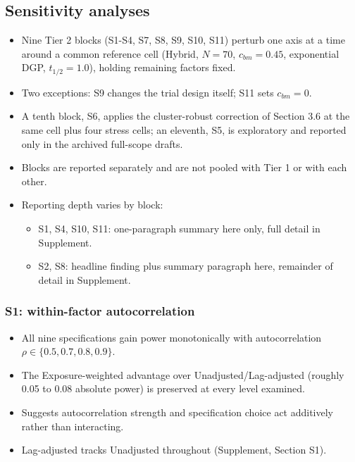 \documentclass[
  11pt,
]{article}
\providecommand{\tightlist}{%
  \setlength{\itemsep}{0pt}\setlength{\parskip}{0pt}}
\begin{document}
\subsection{Sensitivity analyses}\label{sensitivity-analyses}

\begin{itemize}
\tightlist
\item
  Nine Tier 2 blocks (S1-S4, S7, S8, S9, S10, S11) perturb one axis at
  a time around a common reference cell (Hybrid, \(N=70\),
  \(c_{bm}=0.45\), exponential DGP, \(t_{1/2}=1.0\)), holding remaining
  factors fixed.
\item
  Two exceptions: S9 changes the trial design itself; S11 sets
  \(c_{bm}=0\).
\item
  A tenth block, S6, applies the cluster-robust correction of Section
  3.6 at the same cell plus four stress cells; an eleventh, S5, is
  exploratory and reported only in the archived full-scope drafts.
\item
  Blocks are reported separately and are not pooled with Tier 1 or
  with each other.
\item
  Reporting depth varies by block:

  \begin{itemize}
  \tightlist
  \item
    S1, S4, S10, S11: one-paragraph summary here only, full detail in
    Supplement.
  \item
    S2, S8: headline finding plus summary paragraph here, remainder
    of detail in Supplement.
  \end{itemize}
\end{itemize}

\subsubsection{S1: within-factor autocorrelation}\label{s1-within-factor-autocorrelation}

\begin{itemize}
\tightlist
\item
  All nine specifications gain power monotonically with
  autocorrelation \(\rho \in \{0.5, 0.7, 0.8, 0.9\}\).
\item
  The Exposure-weighted advantage over Unadjusted/Lag-adjusted
  (roughly 0.05 to 0.08 absolute power) is preserved at every level
  examined.
\item
  Suggests autocorrelation strength and specification choice act
  additively rather than interacting.
\item
  Lag-adjusted tracks Unadjusted throughout (Supplement, Section S1).
\end{itemize}
\end{document}
